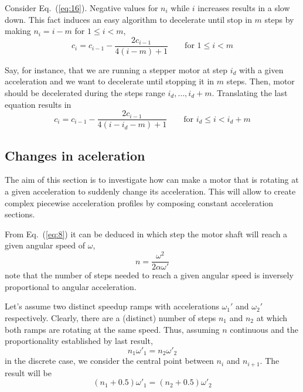 \documentclass[a4paper]{article}
\begin{document}
Consider Eq.~(\ref{eq:16}). Negative values for $n_i$ while $i$
increases results in a slow down. This fact induces an easy algorithm
to decelerate until stop in $m$ steps by making $n_i=i-m$ for
$1\leq i<m$,
\begin{equation}
  \label{eq:18}
  c_i = c_{i-1} - \frac{2c_{i-1}}{4(i - m) + 1} \qquad\text{for $1\leq i<m$}  
\end{equation}

Say, for instance, that we are running a stepper motor at step $i_d$
with a given acceleration and we want to decelerate until stopping it
in $m$ steps. Then, motor should be decelerated during the steps range
$i_d,\dots,i_d+m$. Translating the last equation results in
\begin{equation*}
    c_i  = c_{i-1} - \frac{2c_{i-1}}{4(i-i_d - m) + 1} \qquad\text{for $i_d\leq i<i_d+m$}
\end{equation*}




\subsection{Changes in aceleration}

The aim of this section is to investigate how can make a motor that is
rotating at a given acceleration to suddenly change its
acceleration. This will allow to create complex piecewise acceleration
profiles by composing constant acceleration sections.

From Eq.~(\ref{eq:8}) it can be deduced in which step the motor shaft
will reach a given angular speed of $\omega$,
\begin{equation*}
  n = \frac{\omega^2}{2\alpha\omega'}  
\end{equation*}
note that the number of steps needed to reach a given angular speed is
inversely proportional to angular acceleration.


Let's assume two distinct speedup ramps with accelerations $\omega_1'$
and $\omega_2'$ respectively. Clearly, there are a (distinct) number
of steps $n_1$ and $n_2$ at which both ramps are rotating at the same
speed. Thus, assuming $n$ continuous and the proportionality
established by last result,
\begin{equation*}
   n_1\omega'_1 = n_2\omega'_2
\end{equation*}
in the discrete case, we consider the central point between $n_i$ and
$n_{i+1}$. The result will be
\begin{equation}
  \label{eq:21}
  (n_1+0.5)\omega'_1 = (n_2+0.5)\omega'_2
\end{equation}
\end{document}
